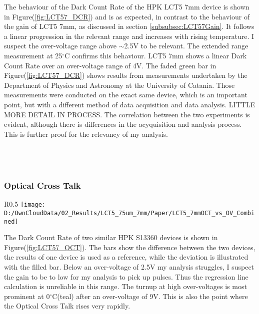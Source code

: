 \documentclass[article,type=msc,colorback,accentcolor=tud9c]{tudthesis}
\begin{document}
The behaviour of the Dark Count Rate of the HPK LCT5 7mm device is shown in Figure(\ref{fig:LCT57_DCR}) and is as expected, in contrast to the behaviour of the gain of LCT5 7mm, as discussed in section \ref{subsubsec:LCT57Gain}. It follows a linear progression in the relevant range and increases with rising temperature. I suspect the over-voltage range above $\sim$2.5V to be relevant. The extended range measurement at 25$^\circ$C confirms this behaviour. LCT5 7mm shows a linear Dark Count Rate over an over-voltage range of 4V. The faded green bar in Figure(\ref{fig:LCT57_DCR}) shows results from measurements undertaken by the Department of Physics and Astronomy at the University of Catania. Those measurements were conducted on the exact same device, which is an important point, but with a different method of data acquisition and data analysis. LITTLE MORE DETAIL IN PROCESS. The correlation between the two experiments is evident, although there is differences in the acyquisition and analysis process. This is further proof for the relevancy of my analysis. 
\\\\\\\\

\subsubsection{Optical Cross Talk}
\begin{wrapfigure}{R}{0.5\textwidth}
\centering
\texttt{[image: D:/OwnCloudData/02\_Results/LCT5\_75um\_7mm/Paper/LCT5\_7mmOCT\_vs\_OV\_Combined]}
\caption{\label{fig:LCT57_OCT}Dark Count Rate of the HPK LCT5 7mm pixel}
\end{wrapfigure}

The Dark Count Rate of two similar HPK S13360 devices is shown in Figure(\ref{fig:LCT57_OCT}). The bars show the difference between the two devices, the results of one device is used as a reference, while the deviation is illustrated with the filled bar. Below an over-voltage of 2.5V my analysis struggles, I suspect the gain to be to low for my analysis to pick up pulses. Thus the regression line calculation is unreliable in this range. The turnup at high over-voltages is most prominent at 0$^{\circ}$C(teal) after an over-voltage of 9V. This is also the point where the Optical Cross Talk rises very rapidly.
\\\\\\\\\\\\\\\\\\\\\\
\end{document}

